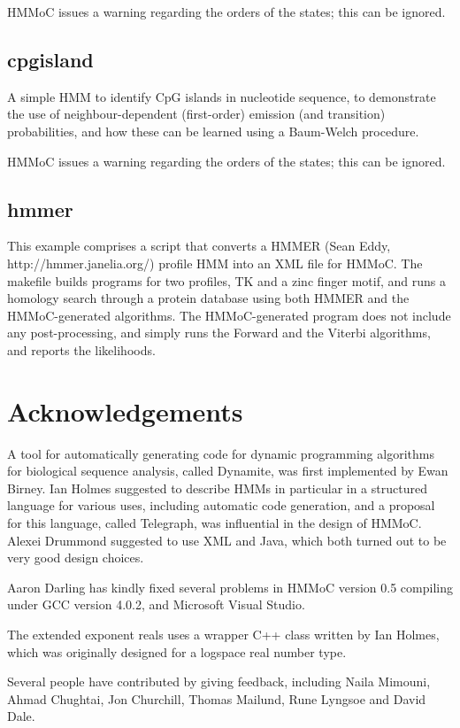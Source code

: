 \documentclass{article}
\begin{document}
HMMoC issues a warning regarding the orders of the states; this can be ignored.


\subsection{cpgisland}

A simple HMM to identify CpG islands in nucleotide sequence, to demonstrate the use of
neighbour-dependent (first-order) emission (and transition) probabilities, and how
these can be learned using a Baum-Welch procedure.

HMMoC issues a warning regarding the orders of the states; this can be ignored.

\subsection{hmmer}

This example comprises a script that converts a HMMER (Sean Eddy, http://hmmer.janelia.org/)
profile HMM into an XML file for HMMoC.  The makefile builds programs for two profiles,
TK and a zinc finger motif, and runs a homology search through a protein database using
both HMMER and the HMMoC-generated algorithms.  The HMMoC-generated program does not include
any post-processing, and simply runs the Forward and the Viterbi algorithms, and reports
the likelihoods.


\section{Acknowledgements}


A tool for automatically generating code for dynamic programming algorithms for biological sequence
analysis, called Dynamite, was first implemented by Ewan Birney.  Ian Holmes suggested to describe
HMMs in particular in a structured language for various uses, including automatic code generation,
and a proposal for this language, called Telegraph, was influential in the design of HMMoC.
Alexei Drummond suggested to use XML and Java, which both turned out to be very good design choices.

Aaron Darling has kindly fixed several problems in HMMoC version 0.5 compiling under GCC version 4.0.2, 
and Microsoft Visual Studio.

The extended exponent reals uses a wrapper C++ class written by Ian Holmes, which was originally designed 
for a logspace real number type.

Several people have contributed by giving feedback, including Naila Mimouni, Ahmad Chughtai, Jon Churchill,
Thomas Mailund, Rune Lyngsoe and David Dale.
\end{document}
